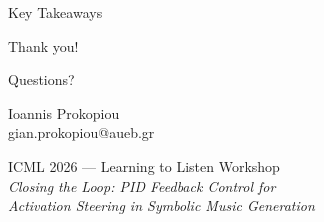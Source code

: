 \documentclass[aspectratio=169, 11pt]{beamer}
\begin{document}
\begin{frame}{Key Takeaways}
\end{frame}

\begin{frame}{}
\begin{center}
\vspace{2em}
{\Huge Thank you!}

\vspace{1.5em}
{\Large Questions?}

\vspace{2em}
{\large Ioannis Prokopiou}\\
{\normalsize gian.prokopiou@aueb.gr}

\vspace{1.5em}
{\small
ICML 2026 --- Learning to Listen Workshop\\[0.3em]
\textit{Closing the Loop: PID Feedback Control for\\Activation Steering in Symbolic Music Generation}
}
\end{center}
\end{frame}

\appendix
\end{document}
